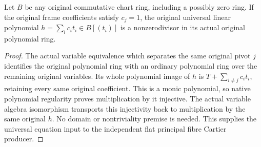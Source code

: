 \begin{lemma}
\label{lem:kn-nadel-bertini-snc-universal-equation-regular}
\leanok
Let $B$ be any original commutative chart ring, including a possibly zero
ring.  If the original frame coefficients satisfy $c_j=1$, the original
universal linear polynomial $h=\sum_i c_i t_i\in B[(t_i)]$ is a
nonzerodivisor in its actual original polynomial ring.
\end{lemma}
\begin{proof}
The actual variable equivalence which separates the same original pivot
$j$ identifies the original polynomial ring with an ordinary polynomial
ring over the remaining original variables.  Its whole polynomial image
of $h$ is $T+\sum_{i\ne j}c_i t_i$, retaining every same original
coefficient.  This is a monic polynomial, so native polynomial regularity
proves multiplication by it injective.  The actual variable algebra
isomorphism transports this injectivity back to multiplication by the
same original $h$.  No domain or nontriviality premise is needed.  This
supplies the universal equation input to the independent flat principal
fibre Cartier producer.
\end{proof}
